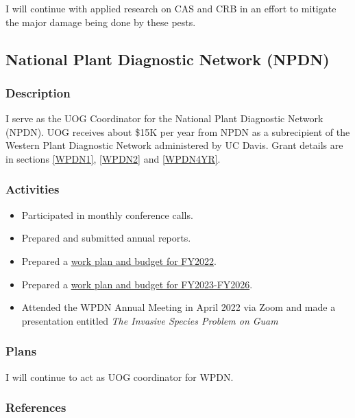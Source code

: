 I will continue with applied research on CAS and CRB in an effort to mitigate the major damage being done by these pests.

\subsection{National Plant Diagnostic Network (NPDN)}
\begin{refsection}

\subsubsection{Description}	

I serve as the UOG Coordinator for the National Plant Diagnostic Network (NPDN). UOG receives about \$15K per year from NPDN as a subrecipient of the Western Plant Diagnostic Network administered by UC Davis. Grant details are in  sections \ref{WPDN1}, \ref{WPDN2} and \ref{WPDN4YR}.

\subsubsection{Activities}

\begin{itemize}
	\item Participated in monthly conference calls.
	\item Prepared and submitted annual reports.
	\item Prepared a \href{https://github.com/aubreymoore/WPDN/blob/main/WPDN\%202021-2022\%20workplan\%20and\%20budget.pdf}{work plan and budget for FY2022}.
	\item Prepared a \href{https://github.com/aubreymoore/WPDN/raw/main/4year/WPDN\%20FY23-FY26\%20workplan\%20and\%20budget\%20for\%20UOG.pdf}{work plan and budget for FY2023-FY2026}.
	\item Attended the WPDN Annual Meeting in April 2022 via Zoom and made a presentation entitled \textit{The Invasive Species Problem on Guam} \cite{moore_invasive_2022}
\end{itemize}

\subsubsection{Plans}

I will continue to act as UOG coordinator for WPDN.

\subsubsection{References}
\printbibliography[heading=none]
\end{refsection}	



